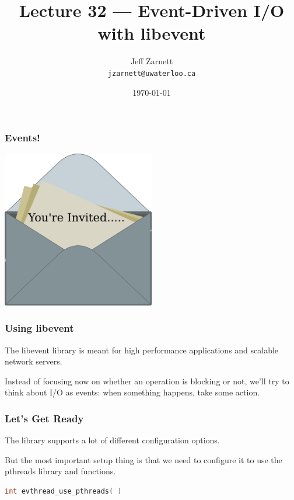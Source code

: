 

\title{Lecture 32 --- Event-Driven I/O with libevent }

\author{Jeff Zarnett \\ \small \texttt{jzarnett@uwaterloo.ca}}
\date{\today}




\begin{frame}
  \titlepage

 \end{frame}



\begin{frame}
\frametitle{Events!}

\begin{center}
	\includegraphics[width=0.5\textwidth]{images/invitation}
\end{center}


\end{frame}


\begin{frame}
\frametitle{Using libevent}

The libevent library is meant for high performance applications and scalable network servers. 

Instead of focusing now on whether an operation is blocking or not, we'll try to think about I/O as events: when something happens, take some action.

\end{frame}


\begin{frame}[fragile]
\frametitle{Let's Get Ready}
The library supports a lot of different configuration options.

But the most important setup thing is that we need to configure it to use the pthreads library and functions.

\begin{lstlisting}[language=C]
int evthread_use_pthreads( )
\end{lstlisting}

\end{frame}


